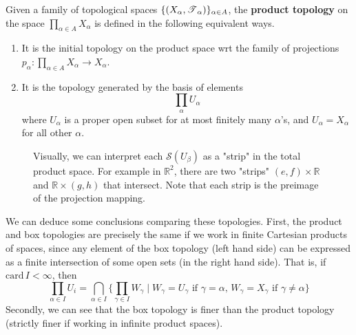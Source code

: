   \begin{definition} 
    Given a family of topological spaces $\{(X_\alpha, \T_\alpha)\}_{\alpha \in A}$, the \textbf{product topology} on the space $\prod_{\alpha \in A} X_\alpha$ is defined in the following equivalent ways. 
    \begin{enumerate}
      \item It is the initial topology on the product space wrt the family of projections $p_\alpha: \prod_{\alpha \in A} X_\alpha \rightarrow X_\alpha$. 

      \item It is the topology generated by the basis of elements 
      \begin{equation}
        \prod_\alpha U_\alpha 
      \end{equation}
      where $U_\alpha$ is a proper open subset for at most finitely many $\alpha$'s, and $U_\alpha = X_\alpha$ for all other $\alpha$. 
    \end{enumerate}

    \begin{figure}[H]
      \centering 
      \caption{Visually, we can interpret each $\mathscr{S} (U_\beta)$ as a "strip" in the total product space. For example in $\mathbb{R}^2$, there are two "strips" $(e, f) \times \mathbb{R}$ and $\mathbb{R} \times (g, h)$ that intersect. Note that each strip is the preimage of the projection mapping. }
      \label{fig:product_topology}
    \end{figure}
  \end{definition}

  We can deduce some conclusions comparing these topologies. First, the product and box topologies are precisely the same if we work in finite Cartesian products of spaces, since any element of the box topology (left hand side) can be expressed as a finite intersection of some open sets (in the right hand side). That is, if $\text{card}\,I < \infty$, then 
  \begin{equation}
    \prod_{\alpha \in I} U_i = \bigcap_{\alpha \in I} \big\{ \prod_{\gamma \in I} W_\gamma \mid W_\gamma = U_\gamma \text{ if } \gamma = \alpha, \, W_\gamma = X_\gamma \text{ if } \gamma \neq \alpha\big\}
  \end{equation}
  Secondly, we can see that the box topology is finer than the product topology (strictly finer if working in infinite product spaces). 

